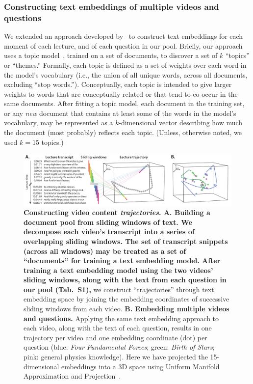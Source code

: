 \documentclass[10pt]{article}
\newcommand{\questions}{S1}
\begin{document}
\subsubsection*{Constructing text embeddings of multiple videos and questions}

We extended an approach developed by~\citep{HeusEtal21} to construct text
embeddings for each moment of each lecture, and of each question in our pool.
Briefly, our approach uses a topic model~\citep{BleiEtal03}, trained on a set
of documents, to discover a set of $k$ ``topics'' or ``themes.'' Formally, each
topic is defined as a set of weights over each word in the model's vocabulary
(i.e., the union of all unique words, across all documents, excluding ``stop
words.''). Conceptually, each topic is intended to give larger weights to words
that are conceptually related or that tend to co-occur in the same documents.
After fitting a topic model, each document in the training set, or any
\textit{new} document that contains at least some of the words in the model's
vocabulary, may be represented as a $k$-dimensional vector describing how much
the document (most probably) reflects each topic. (Unless, otherwise noted, we
used $k = 15$ topics.)

\begin{figure}[tp]
\centering
\includegraphics[width=\textwidth]{figs/sliding_windows}

\caption{\textbf{Constructing video content \textit{trajectories}. \textbf{A.
Building a document pool from sliding windows of text.} We decompose each
video's transcript into a series of overlapping sliding windows. The set of
transcript snippets (across all windows) may be treated as a set of
``documents'' for training a text embedding model. After training a text
embedding model using the two videos' sliding windows, along with the text from
each question in our pool (Tab.~\questions), } we construct ``trajectories''
through text embedding space by joining the embedding coordinates of successive
sliding windows from each video. \textbf{B. Embedding multiple videos and
questions.} Applying the same text embedding approach to each video, along with
the text of each question, results in one trajectory per video and one
embedding coordinate (dot) per question (blue: \textit{Four Fundamental
Forces}; green: \textit{Birth of Stars}; pink: general physics knowledge). Here
we have projected the 15-dimensional embeddings into a 3D space using Uniform
Manifold Approximation and Projection~\citep[UMAP;][]{McInEtal18a}.}

\label{fig:sliding-windows}
\end{figure}
\end{document}
